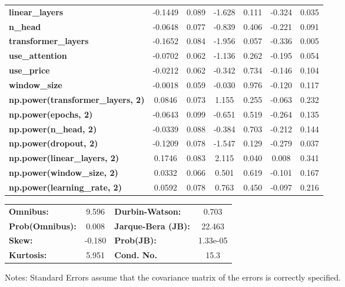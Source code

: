 \begin{center}
\begin{tabular}{lcccccc}
\textbf{linear\_layers}                   &      -0.1449  &        0.089     &    -1.628  &         0.111        &       -0.324    &        0.035     \\
\textbf{n\_head}                          &      -0.0648  &        0.077     &    -0.839  &         0.406        &       -0.221    &        0.091     \\
\textbf{transformer\_layers}              &      -0.1652  &        0.084     &    -1.956  &         0.057        &       -0.336    &        0.005     \\
\textbf{use\_attention}                   &      -0.0702  &        0.062     &    -1.136  &         0.262        &       -0.195    &        0.054     \\
\textbf{use\_price}                       &      -0.0212  &        0.062     &    -0.342  &         0.734        &       -0.146    &        0.104     \\
\textbf{window\_size}                     &      -0.0018  &        0.059     &    -0.030  &         0.976        &       -0.120    &        0.117     \\
\textbf{np.power(transformer\_layers, 2)} &       0.0846  &        0.073     &     1.155  &         0.255        &       -0.063    &        0.232     \\
\textbf{np.power(epochs, 2)}              &      -0.0643  &        0.099     &    -0.651  &         0.519        &       -0.264    &        0.135     \\
\textbf{np.power(n\_head, 2)}             &      -0.0339  &        0.088     &    -0.384  &         0.703        &       -0.212    &        0.144     \\
\textbf{np.power(dropout, 2)}             &      -0.1209  &        0.078     &    -1.547  &         0.129        &       -0.279    &        0.037     \\
\textbf{np.power(linear\_layers, 2)}      &       0.1746  &        0.083     &     2.115  &         0.040        &        0.008    &        0.341     \\
\textbf{np.power(window\_size, 2)}        &       0.0332  &        0.066     &     0.501  &         0.619        &       -0.101    &        0.167     \\
\textbf{np.power(learning\_rate, 2)}      &       0.0592  &        0.078     &     0.763  &         0.450        &       -0.097    &        0.216     \\
\bottomrule
\end{tabular}
\begin{tabular}{lclc}
\textbf{Omnibus:}       &  9.596 & \textbf{  Durbin-Watson:     } &    0.703  \\
\textbf{Prob(Omnibus):} &  0.008 & \textbf{  Jarque-Bera (JB):  } &   22.463  \\
\textbf{Skew:}          & -0.180 & \textbf{  Prob(JB):          } & 1.33e-05  \\
\textbf{Kurtosis:}      &  5.951 & \textbf{  Cond. No.          } &     15.3  \\
\bottomrule
\end{tabular}
\end{center}

Notes: \newline
 [1] Standard Errors assume that the covariance matrix of the errors is correctly specified.